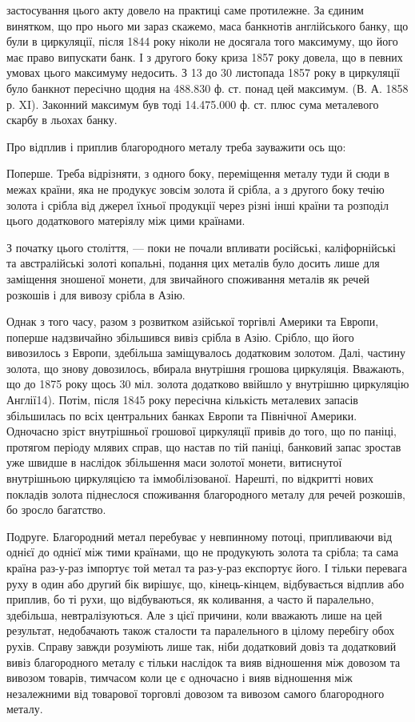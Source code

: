 \parcont{}  %
застосування цього акту довело на практиці саме протилежне. За єдиним винятком,
що про нього ми зараз скажемо, маса банкнотів англійського банку,
що були в циркуляції, після 1844 року ніколи не досягала того максимуму, що
його має право випускати банк. І з другого боку криза 1857 року довела, що
в певних умовах цього максимуму недосить. З 13 до 30 листопада 1857 року
в циркуляції було банкнот пересічно щодня на 488.830 ф. ст. понад цей
максимум. (В. А. 1858 р. XI). Законний максимум був тоді 14.475.000 ф. ст.
плюс сума металевого скарбу в льохах банку.

Про відплив і приплив благородного металу треба зауважити ось що:

Поперше. Треба відрізняти, з одного боку, переміщення металу туди
й сюди в межах країни, яка не продукує зовсім золота й срібла, а з другого
боку течію золота і срібла від джерел їхньої продукції через різні інші країни
та розподіл цього додаткового матеріялу між цими країнами.

З початку цього століття, — поки не почали впливати російські, каліфорнійські
та австралійські золоті копальні, подання цих металів було досить лише
для заміщення зношеної монети, для звичайного споживання металів як речей
розкошів і для вивозу срібла в Азію.

Однак з того часу, разом з розвитком азійської торгівлі Америки та Европи,
поперше надзвичайно збільшився вивіз срібла в Азію. Срібло, що його вивозилось
з Европи, здебільша заміщувалось додатковим золотом. Далі, частину золота,
що знову довозилось, вбирала внутрішня грошова циркуляція. Вважають, що до
1875 року щось 30 міл. золота додатково ввійшло у внутрішню циркуляцію Англії14).
Потім, після 1845 року пересічна кількість металевих запасів збільшилась по всіх
центральних банках Европи та Північної Америки. Одночасно зріст внутрішньої
грошової циркуляції привів до того, що по паніці, протягом періоду млявих
справ, що настав по тій паніці, банковий запас зростав уже швидше в наслідок
збільшення маси золотої монети, витиснутої внутрішньою циркуляцією та іммобілізованої.
Нарешті, по відкритті нових покладів золота піднеслося споживання
благородного металу для речей розкошів, бо зросло багатство.

Подруге. Благородний метал перебуває у невпинному потоці, припливаючи
від однієї до однієї між тими країнами, що не продукують золота та
срібла; та сама країна раз-у-раз імпортує той метал та раз-у-раз експортує
його. І тільки перевага руху в один або другий бік вирішує, що, кінець-кінцем,
відбувається відплив або приплив, бо ті рухи, що відбуваються, як коливання,
а часто й паралельно, здебільша, невтралізуються. Але з цієї причини,
коли вважають лише на цей результат, недобачають також сталости та паралельного
в цілому перебігу обох рухів. Справу завжди розуміють лише так, ніби
додатковий довіз та додатковий вивіз благородного металу є тільки наслідок та
вияв відношення між довозом та вивозом товарів, тимчасом коли це є одночасно
і вияв відношення між незалежними від товарової торговлі довозом та вивозом
самого благородного металу.

